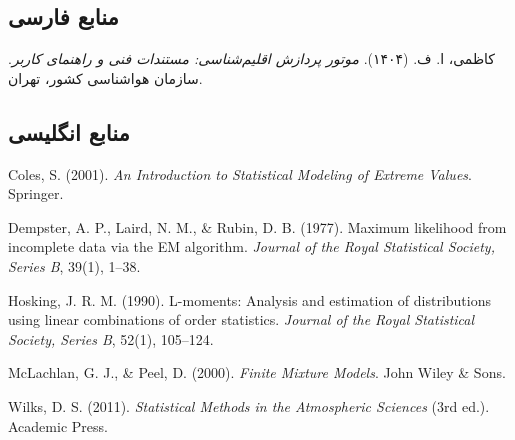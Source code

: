\documentclass[a4paper,12pt]{article}
\begin{document}
\subsection*{منابع فارسی}

کاظمی، ا. ف. (۱۴۰۴). \textit{موتور پردازش اقلیم‌شناسی: مستندات فنی و راهنمای کاربر}. سازمان هواشناسی کشور، تهران.

\subsection*{منابع انگلیسی}

Coles, S. (2001). \textit{An Introduction to Statistical Modeling of Extreme Values}. Springer.

Dempster, A. P., Laird, N. M., \& Rubin, D. B. (1977). Maximum likelihood from incomplete data via the EM algorithm. \textit{Journal of the Royal Statistical Society, Series B}, 39(1), 1–38.

Hosking, J. R. M. (1990). L-moments: Analysis and estimation of distributions using linear combinations of order statistics. \textit{Journal of the Royal Statistical Society, Series B}, 52(1), 105–124.

McLachlan, G. J., \& Peel, D. (2000). \textit{Finite Mixture Models}. John Wiley \& Sons.

Wilks, D. S. (2011). \textit{Statistical Methods in the Atmospheric Sciences} (3rd ed.). Academic Press.
\end{document}
